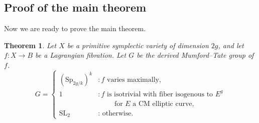 \documentclass[12pt]{amsart}
\newcommand{\Sp}{\mathrm{Sp}}
\newcommand{\SL}{\mathrm{SL}}
\newtheorem{theorem}{Theorem}[section]
\theoremstyle{definition}
\numberwithin{equation}{section}
\begin{document}
\subsection{Proof of the main theorem}


Now we are ready to prove the main theorem. 

\begin{theorem}
    Let \(X\) be a primitive symplectic variety of dimension \(2g\), and let 
    \(f: X \to B\) be a Lagrangian fibration. Let \(G\) be the derived Mumford--Tate 
    group of \(f\). 
    \begin{equation*}
        G = \begin{cases}
            (\Sp_{2g/k})^k & : f \text{ varies maximally,} \\
            1 & : f \text{ is isotrivial with fiber isogenous to } E^g\\
            & \qquad \text{ for  } E \text{ a CM elliptic curve,}\\
            \SL_2 & : \text{ otherwise.}
        \end{cases}
    \end{equation*}
\end{theorem}
\end{document}

